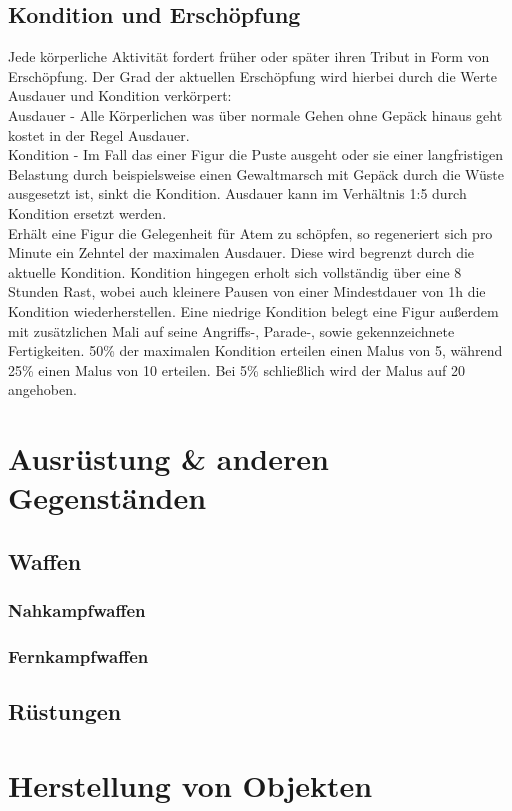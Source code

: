 \documentclass[a4paper,12pt,oneside]{book}
\begin{document}
\chapter{Kondition und Erschöpfung}
Jede körperliche Aktivität fordert früher oder später ihren Tribut in Form von Erschöpfung. Der Grad der aktuellen Erschöpfung wird hierbei durch die Werte Ausdauer und Kondition verkörpert:
\\Ausdauer - Alle Körperlichen was über normale Gehen ohne Gepäck hinaus geht kostet in der Regel Ausdauer.
\\Kondition - Im Fall das einer Figur die Puste ausgeht oder sie einer langfristigen Belastung durch beispielsweise einen Gewaltmarsch mit Gepäck durch die Wüste ausgesetzt ist, sinkt die Kondition. Ausdauer kann im Verhältnis 1:5 durch Kondition ersetzt werden.
\\Erhält eine Figur die Gelegenheit für Atem zu schöpfen, so regeneriert sich pro Minute ein Zehntel der maximalen Ausdauer. Diese wird begrenzt durch die aktuelle Kondition. Kondition hingegen erholt sich vollständig über eine 8 Stunden Rast, wobei auch kleinere Pausen von einer Mindestdauer von 1h die Kondition wiederherstellen.
Eine niedrige Kondition belegt eine Figur außerdem mit zusätzlichen Mali auf seine Angriffs-, Parade-, sowie gekennzeichnete Fertigkeiten.
50\% der maximalen Kondition erteilen einen Malus von 5, während 25\% einen Malus von 10 erteilen. Bei 5\% schließlich wird der Malus auf 20 angehoben.
\part{Ausrüstung \& anderen Gegenständen}
\setcounter{chapter}{0}
\chapter{Waffen}
\section{Nahkampfwaffen}

\section{Fernkampfwaffen}
\chapter{Rüstungen}



\part{Herstellung von Objekten}
\setcounter{chapter}{0}
\end{document}
